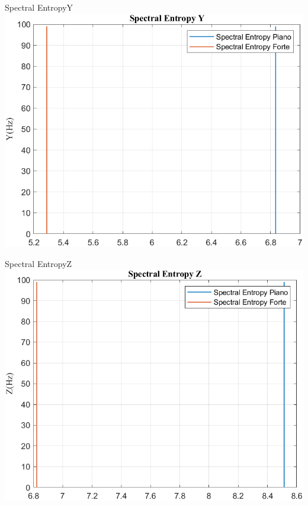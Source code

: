 	\begin{frame}{{Spectral EntropyY}}
		\centering\includegraphics[height=.8\textheight]{figure/Mag/Trasformata/Spectral EntropyY}
	\end{frame}
	
	\begin{frame}{{Spectral EntropyZ}}
		\centering\includegraphics[height=.8\textheight]{figure/Mag/Trasformata/Spectral EntropyZ}
	\end{frame}
	
